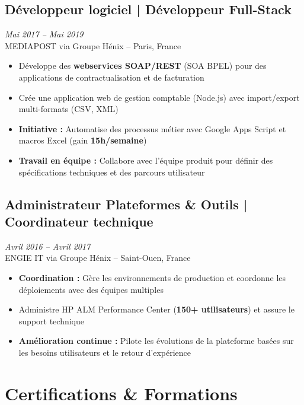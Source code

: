 \documentclass[11pt,a4paper]{article}
\newcommand{\highlight}[1]{\textcolor{primaryblue}{\textbf{#1}}}
\newcommand{\keypoint}[1]{\textbf{#1}}
\begin{document}
\subsection*{Développeur logiciel | Développeur Full-Stack} \hfill \textit{\color{mediumgray}Mai 2017 -- Mai 2019}\\
MEDIAPOST via Groupe Hénix -- Paris, France
\begin{itemize}[leftmargin=22pt]
    \item Développe des \highlight{webservices SOAP/REST} (SOA BPEL) pour des applications de contractualisation et de facturation
    \item Crée une application web de gestion comptable (Node.js) avec import/export multi-formats (CSV, XML)
    \item \highlight{Initiative :} Automatise des processus métier avec Google Apps Script et macros Excel (gain \keypoint{15h/semaine})
    \item \highlight{Travail en équipe :} Collabore avec l'équipe produit pour définir des spécifications techniques et des parcours utilisateur
\end{itemize}

\subsection*{Administrateur Plateformes \& Outils | Coordinateur technique} \hfill \textit{\color{mediumgray}Avril 2016 -- Avril 2017}\\
ENGIE IT via Groupe Hénix -- Saint-Ouen, France
\begin{itemize}[leftmargin=22pt]
    \item \highlight{Coordination :} Gère les environnements de production et coordonne les déploiements avec des équipes multiples
    \item Administre HP ALM Performance Center (\keypoint{150+ utilisateurs}) et assure le support technique
    \item \highlight{Amélioration continue :} Pilote les évolutions de la plateforme basées sur les besoins utilisateurs et le retour d'expérience
\end{itemize}

\vspace{6pt}

\section*{Certifications \& Formations}
\end{document}
